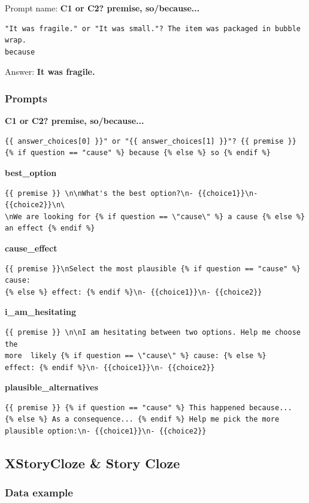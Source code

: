 \documentclass[twoside,11pt]{article}
\begin{document}
Prompt name: \textbf{C1 or C2? premise, so/because...}
\begin{verbatim}
"It was fragile." or "It was small."? The item was packaged in bubble wrap.  
because
\end{verbatim}
Answer: \textbf{It was fragile.}

\subsubsection{Prompts}

\noindent\textbf{C1 or C2? premise, so/because...}
\begin{verbatim}
{{ answer_choices[0] }}" or "{{ answer_choices[1] }}"? {{ premise }} 
{% if question == "cause" %} because {% else %} so {% endif %}
\end{verbatim}

\noindent\textbf{best\_option}
\begin{verbatim}
{{ premise }} \n\nWhat's the best option?\n- {{choice1}}\n- {{choice2}}\n\
\nWe are looking for {% if question == \"cause\" %} a cause {% else %} 
an effect {% endif %}    
\end{verbatim}

\noindent\textbf{cause\_effect}
\begin{verbatim}
{{ premise }}\nSelect the most plausible {% if question == "cause" %} cause: 
{% else %} effect: {% endif %}\n- {{choice1}}\n- {{choice2}}
\end{verbatim}

\noindent\textbf{i\_am\_hesitating}
\begin{verbatim}
{{ premise }} \n\nI am hesitating between two options. Help me choose the 
more  likely {% if question == \"cause\" %} cause: {% else %} 
effect: {% endif %}\n- {{choice1}}\n- {{choice2}}      
\end{verbatim}

\noindent\textbf{plausible\_alternatives}
\begin{verbatim}
{{ premise }} {% if question == "cause" %} This happened because... 
{% else %} As a consequence... {% endif %} Help me pick the more 
plausible option:\n- {{choice1}}\n- {{choice2}}
\end{verbatim}

\subsection{XStoryCloze \& Story Cloze}

\subsubsection{Data example}
\end{document}
